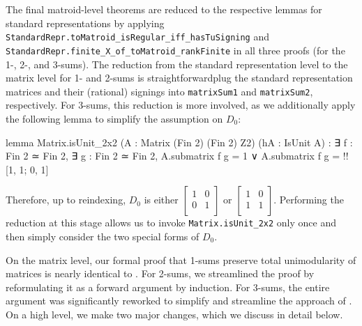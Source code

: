 The final matroid-level theorems are reduced to the respective lemmas for standard representations by applying \texttt{StandardRepr.toMatroid\_isRegular\_iff\_hasTuSigning} and \texttt{StandardRepr.finite\_X\_of\_toMatroid\_rankFinite} in all three proofs (for the 1-, 2-, and 3-sums). The reduction from the standard representation level to the matrix level for 1- and 2-sums is straightforward\EmDash plug the standard representation matrices and their (rational) signings into \texttt{matrixSum1} and \texttt{matrixSum2}, respectively. For 3-sums, this reduction is more involved, as we additionally apply the following lemma to simplify the assumption on $D_{0}$:
\begin{leancode}
lemma Matrix.isUnit_2x2
    (A : Matrix (Fin 2) (Fin 2) Z2)
    (hA : IsUnit A) :
  ∃ f : Fin 2 ≃ Fin 2,
  ∃ g : Fin 2 ≃ Fin 2,
    A.submatrix f g = 1 ∨
    A.submatrix f g = !![1, 1; 0, 1]
\end{leancode}
Therefore, up to reindexing, $D_{0}$ is either $\begin{bmatrix} 1 & 0 \\ 0 & 1 \\ \end{bmatrix}$ or $\begin{bmatrix} 1 & 0 \\ 1 & 1 \\ \end{bmatrix}$. Performing the reduction at this stage allows us to invoke \texttt{Matrix.isUnit\_2x2} only once and then simply consider the two special forms of $D_{0}$.

On the matrix level, our formal proof that 1-sums preserve total unimodularity of matrices is nearly identical to \cite{Truemper2016}. For 2-sums, we streamlined the proof by reformulating it as a forward argument by induction. For 3-sums, the entire argument was significantly reworked to simplify and streamline the approach of \cite{Truemper2016}. On a high level, we make two major changes, which we discuss in detail below.

